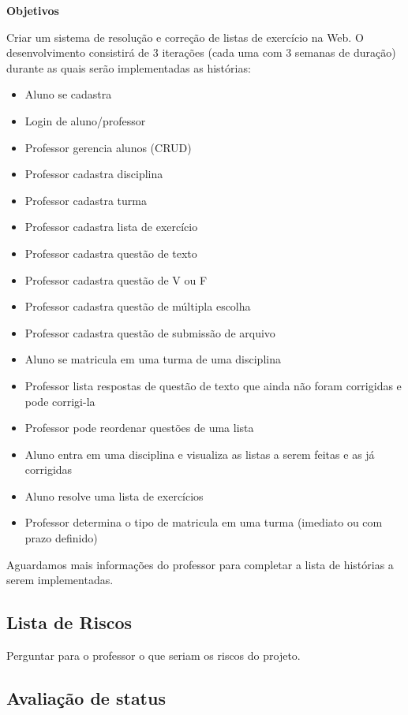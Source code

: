 \documentclass[12pt,letterpaper]{article}
\begin{document}
\vspace{1cm}
{\large {\bf Objetivos}}
\vspace{0.5cm}

Criar um sistema de resolução e correção de listas de exercício na Web.
O desenvolvimento consistirá de 3 iterações (cada uma com 3 semanas de duração) durante as quais serão implementadas as histórias:

\begin{itemize}
\item{Aluno se cadastra}
\item{Login de aluno/professor}
\item{Professor gerencia alunos (CRUD)}
\item{Professor cadastra disciplina}
\item{Professor cadastra turma}
\item{Professor cadastra lista de exercício}
\item{Professor cadastra questão de texto}
\item{Professor cadastra questão de V ou F}
\item{Professor cadastra questão de múltipla escolha}
\item{Professor cadastra questão de submissão de arquivo}
\item{Aluno se matricula em uma turma de uma disciplina}
\item{Professor lista respostas de questão de texto que ainda não foram corrigidas e pode corrigi-la}
\item{Professor pode reordenar questões de uma lista}
\item{Aluno entra em uma disciplina e visualiza as listas a serem feitas e as já corrigidas}
\item{Aluno resolve uma lista de exercícios}
\item{Professor determina o tipo de matricula em uma turma (imediato ou com prazo definido)}
\end{itemize}
Aguardamos mais informações do professor para completar a lista de histórias a serem implementadas.



\subsection{Lista de Riscos}

Perguntar para o professor o que seriam os riscos do projeto.

\subsection{Avaliação de status}
\end{document}
